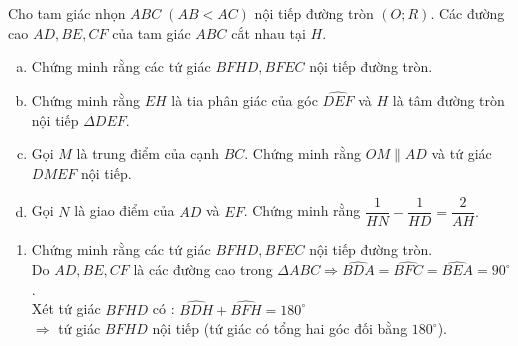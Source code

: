 	\begin{ex}%
		Cho tam giác nhọn $ABC\;(AB < AC)$ nội tiếp đường tròn $(O; R)$. Các đường cao $AD, BE, CF$ của 
		tam giác $ABC$ cắt nhau tại $H$.
		\begin{enumerate}[a)]
			\item Chứng minh rằng các tứ giác $BFHD, BFEC$ nội tiếp đường tròn.
			\item Chứng minh rằng $EH$ là tia phân giác của góc $\widehat{DEF}$ và $H$ là tâm đường tròn nội tiếp $\Delta DEF.$
			\item Gọi $M$ là trung điểm của cạnh $BC$. Chứng minh rằng $OM \parallel AD$ và tứ giác $DMEF$ nội tiếp. 
			\item Gọi $N$ là giao điểm của $AD$ và $EF$. Chứng minh rằng $\dfrac{1}{HN}-\dfrac{1}{HD}=\dfrac{2}{AH}.$ 
		\end{enumerate}
		\loigiai
		{
			\begin{center}
			\end{center}
		\begin{enumerate}
			\item Chứng minh rằng các tứ giác $BFHD, BFEC$ nội tiếp đường tròn.\\
					Do $AD,BE,CF$ là các đường cao trong $\Delta ABC \Rightarrow \widehat{BDA}=\widehat{BFC} = \widehat{BEA}=90 ^{\circ}$.\\
					Xét tứ giác $BFHD$ có :
						$\widehat{BDH} + \widehat{BFH}=180 ^{\circ}$\\
						$\Rightarrow$ tứ giác $BFHD$ nội tiếp (tứ giác có tổng hai góc đối bằng $180 ^{\circ}$).\\

\end{enumerate}}
\end{ex}

